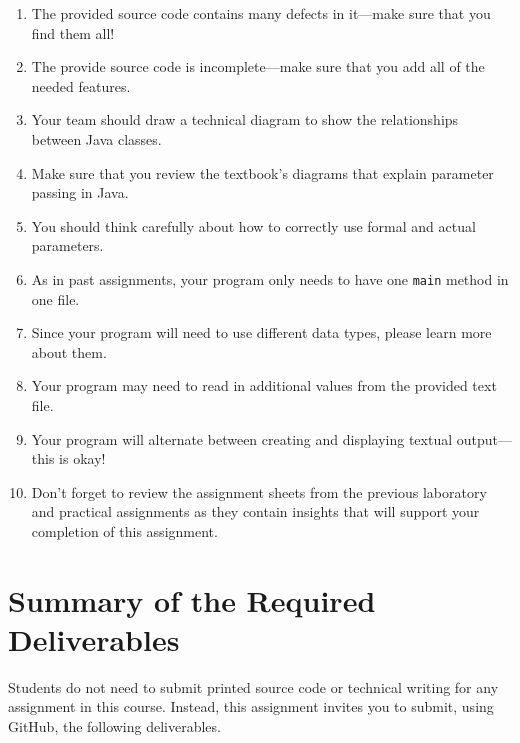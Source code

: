 \documentclass[11pt]{article}
\begin{document}
\begin{enumerate}
  \setlength{\itemsep}{.1pt}

\item The provided source code contains many defects in it---make sure that you find them all!

\item The provide source code is incomplete---make sure that you add all of the needed features.

\item Your team should draw a technical diagram to show the relationships between Java classes.

\item Make sure that you review the textbook's diagrams that explain parameter
  passing in Java.

\item You should think carefully about how to correctly use formal and actual parameters.

\item As in past assignments, your program only needs to have one {\tt main} method in one file.

\item Since your program will need to use different data types, please learn more about them.

\item Your program may need to read in additional values from the provided text file.

\item Your program will alternate between creating and displaying textual
  output---this is okay!

\item Don't forget to review the assignment sheets from the previous laboratory
  and practical assignments as they contain insights that will support your
  completion of this assignment.

\end{enumerate}

\section*{Summary of the Required Deliverables}

\noindent Students do not need to submit printed source code or technical
writing for any assignment in this course. Instead, this assignment invites you
to submit, using GitHub, the following deliverables.
\end{document}
